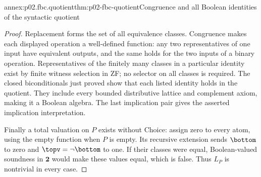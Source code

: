\begin{annexitem}{annex:p02.fbc.quotient}{thm:p02-fbc-quotient}{Congruence and all Boolean identities of the syntactic quotient}
\begin{proof}
Replacement forms the set of all equivalence classes.
Congruence makes each displayed operation a well-defined function:
any two representatives of one input have equivalent outputs, and
the same holds for the two inputs of a binary operation.
Representatives of the finitely many classes in a particular identity
exist by finite witness selection in ZF; no selector on all classes
is required. The closed biconditionals just proved show that each
listed identity holds in the quotient. They include every bounded
distributive lattice and complement axiom, making it a Boolean algebra.
The last implication pair gives the asserted implication interpretation.

Finally a total valuation on \(P\) exists without Choice: assign
zero to every atom, using the empty function when \(P\) is empty.
Its recursive extension sends \(\bottom\) to zero and
\(\topv=\neg\bottom\) to one. If their classes were equal,
Boolean-valued soundness in \(\mathbf2\) would make these values equal,
which is false. Thus \(L_P\) is nontrivial in every case.
\end{proof}
\end{annexitem}

